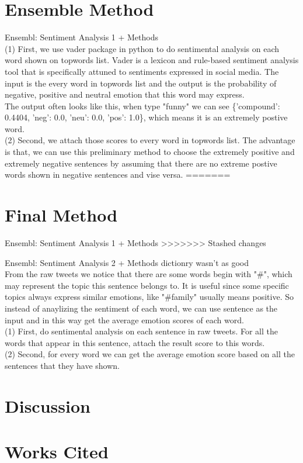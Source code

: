 \documentclass[]{article}
\begin{document}
\section{Ensemble Method}
Ensembl: Sentiment Analysis 1 + Methods \\
(1) First, we use vader package in python to do sentimental analysis on each word shown on topwords list. Vader is a lexicon and rule-based sentiment analysis tool that is specifically attuned to sentiments expressed in social media.
The input is the every word in topwords list and the output is the probability of negative, positive and neutral emotion that this word may express. \\
The output often looks like this, when type "funny" we can see \{'compound': 0.4404, 'neg': 0.0, 'neu': 0.0, 'pos': 1.0\}, which means it is an extremely postive word. \\
(2) Second, we attach those scores to every word in topwords list. The advantage is that, we can use this preliminary method to choose the extremely positive and extremely negative sentences by assuming that there are no
extreme postive words shown in negative sentences and vise versa. 
=======
\section{Final Method}
Ensembl: Sentiment Analysis 1 + Methods
>>>>>>> Stashed changes

Ensembl: Sentiment Analysis 2 + Methods
dictionry wasn't as good \\
From the raw tweets we notice that there are some words begin with "#", which may represent the topic this sentence belongs to. It is useful since some specific topics always express similar emotions, like "#family" usually means positive.
So instead of anaylizing the sentiment of each word, we can use sentence as the input and in this way get the average emotion scores of each word.\\
(1) First, do sentimental analysis on each sentence in raw tweets. For all the words that appear in this sentence, attach the result score to this words. \\
(2) Second, for every word we can get the average emotion score based on all the sentences that they have shown.





\section{Discussion}

\section{Works Cited}
\begin{thebibliography}{1}


\end{thebibliography}
\end{document}
